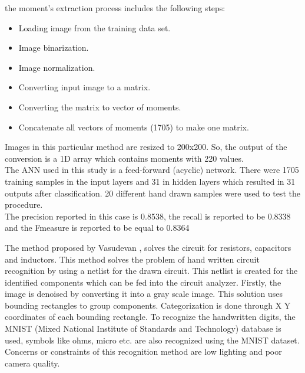 \documentclass[conference]{IEEEtran}
\begin{document}
the moment’s extraction process includes the following steps: 

\begin{itemize}
    \item Loading image from the training data set. 
    \item Image binarization. 
    \item Image normalization.  
    \item Converting input image to a matrix. 
    \item Converting the matrix to vector of moments. 
    \item Concatenate all vectors of moments (1705) to make one matrix. 
\end{itemize}

Images in this particular method are resized to 200x200. So, the output of the conversion is a 1D array which contains moments with 220 values. \\ 

\noindent
The ANN used in this study is a feed-forward (acyclic) network. There were 1705 training samples in the input layers and 31 in hidden layers which resulted in 31 outputs after classification. 20 different hand drawn samples were used to test the procedure.\\

\noindent
The precision reported in this case is 0.8538, the recall is reported to be 0.8338 and the Fmeasure is reported to be equal to 0.8364 \\

\noindent

The method proposed by Vasudevan \cite{IP_techs}, solves the circuit for resistors, capacitors and inductors. This method solves the problem of hand written circuit recognition by using a netlist for the drawn circuit.  This netlist is created for the identified components which can be fed into the circuit analyzer. Firstly, the image is denoised by converting it into a gray scale image. This solution uses bounding rectangles to group components. Categorization is done through X Y coordinates of each bounding rectangle.  To recognize the handwritten digits, the MNIST (Mixed National Institute of Standards and Technology) database is used, symbols like ohms, micro etc. are also recognized using the MNIST dataset. Concerns or constraints of this recognition method are low lighting and poor camera quality.
\end{document}
